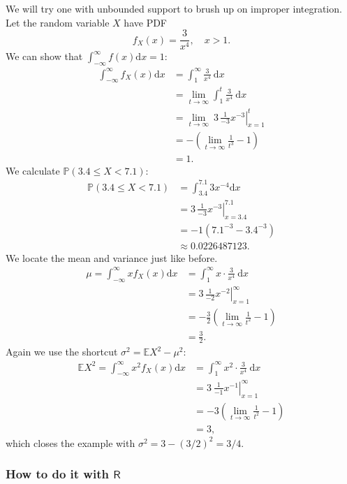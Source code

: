 \documentclass[captions=tableheading]{scrbook}
\begin{document}
\begin{example}

We will try one with unbounded support to brush up on improper integration. Let the random variable \(X\) have PDF
\[
f_{X}(x)=\frac{3}{x^{4}},\quad x>1.
\]
We can show that \(\int_{-\infty}^{\infty}f(x)\mathrm{d} x=1\):
\begin{align*}
\int_{-\infty}^{\infty}f_{X}(x)\mathrm{d} x & =\int_{1}^{\infty}\frac{3}{x^{4}}\:\mathrm{d} x\\
 & =\lim_{t\to\infty}\int_{1}^{t}\frac{3}{x^{4}}\:\mathrm{d} x\\
 & =\lim_{t\to\infty}\ \left.3\,\frac{1}{-3}x^{-3}\right|_{x=1}^{t}\\
 & =-\left(\lim_{t\to\infty}\frac{1}{t^{3}}-1\right)\\
 & =1.
\end{align*}
We calculate \(\mathbb{P}(3.4\leq X<7.1)\):
\begin{align*}
\mathbb{P}(3.4\leq X<7.1) & =\int_{3.4}^{7.1}3x^{-4}\mathrm{d} x\\
 & =\left.3\,\frac{1}{-3}x^{-3}\right|_{x=3.4}^{7.1}\\
 & =-1(7.1^{-3}-3.4^{-3})\\
 & \approx0.0226487123.
\end{align*}
We locate the mean and variance just like before.
\begin{align*}
\mu=\int_{-\infty}^{\infty}xf_{X}(x)\mathrm{d} x & =\int_{1}^{\infty}x\cdot\frac{3}{x^{4}}\:\mathrm{d} x\\
 & =\left.3\,\frac{1}{-2}x^{-2}\right|_{x=1}^{\infty}\\
 & =-\frac{3}{2}\left(\lim_{t\to\infty}\frac{1}{t^{2}}-1\right)\\
 & =\frac{3}{2}.
\end{align*}
Again we use the shortcut \(\sigma^{2}=\mathbb{E} X^{2}-\mu^{2}\):
\begin{align*}
\mathbb{E} X^{2}=\int_{-\infty}^{\infty}x^{2}f_{X}(x)\mathrm{d} x & =\int_{1}^{\infty}x^{2}\cdot\frac{3}{x^{4}}\:\mathrm{d} x\\
 & =\left.3\:\frac{1}{-1}x^{-1}\right|_{x=1}^{\infty}\\
 & =-3\left(\lim_{t\to\infty}\frac{1}{t^{2}}-1\right)\\
 & =3,
\end{align*}
which closes the example with \(\sigma^{2}=3-(3/2)^{2}=3/4\).
\end{example}
\subsubsection{How to do it with \(\mathsf{R}\)}
\label{sec-1-1-2-1}
\end{document}
